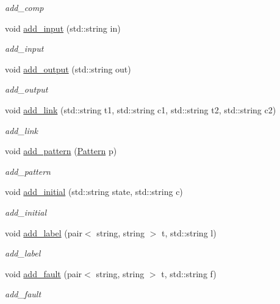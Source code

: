 \begin{DoxyCompactItemize}
\begin{DoxyCompactList}\small\item\em add\+\_\+comp \end{DoxyCompactList}\item 
void \hyperlink{class_network_model_a8abdad23ae7632e76df54c7ba69f49bc}{add\+\_\+input} (std\+::string in)
\begin{DoxyCompactList}\small\item\em add\+\_\+input \end{DoxyCompactList}\item 
void \hyperlink{class_network_model_aad3bec0b61c3b3b7e8fbaa3f03d1ae45}{add\+\_\+output} (std\+::string out)
\begin{DoxyCompactList}\small\item\em add\+\_\+output \end{DoxyCompactList}\item 
void \hyperlink{class_network_model_aa5b933f3e3874d655aa5e9c81bff76bc}{add\+\_\+link} (std\+::string t1, std\+::string c1, std\+::string t2, std\+::string c2)
\begin{DoxyCompactList}\small\item\em add\+\_\+link \end{DoxyCompactList}\item 
void \hyperlink{class_network_model_a8c43ca2b56e307410d8dad56392ce773}{add\+\_\+pattern} (\hyperlink{class_pattern}{Pattern} p)
\begin{DoxyCompactList}\small\item\em add\+\_\+pattern \end{DoxyCompactList}\item 
void \hyperlink{class_network_model_a4e76c93d40e4b3e890d07b6bbda11028}{add\+\_\+initial} (std\+::string state, std\+::string c)
\begin{DoxyCompactList}\small\item\em add\+\_\+initial \end{DoxyCompactList}\item 
void \hyperlink{class_network_model_ad3aa91bba2f26afb2cc2a25f29897420}{add\+\_\+label} (pair$<$ string, string $>$ t, std\+::string l)
\begin{DoxyCompactList}\small\item\em add\+\_\+label \end{DoxyCompactList}\item 
void \hyperlink{class_network_model_a08043ed822076e4a9919c9778093cd12}{add\+\_\+fault} (pair$<$ string, string $>$ t, std\+::string f)
\begin{DoxyCompactList}\small\item\em add\+\_\+fault \end{DoxyCompactList}\item 

\end{DoxyCompactItemize}
